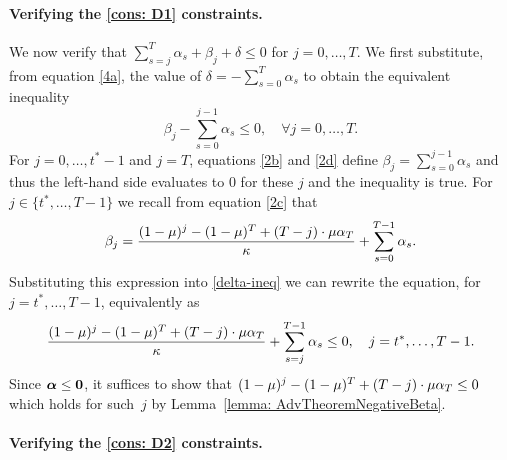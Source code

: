    \paragraph{Verifying the \ref{cons: D1} constraints.} We now verify that $
    \sum_{s=j}^T \alpha_s + \beta_j + \delta \leq 0$ for $j = 0, \ldots, T$.
    We first substitute, from equation \eqref{4a}, the value of $\delta = - \sum_{s=0}^T \alpha_s$ to obtain the equivalent inequality
    \begin{equation}
    \label{delta-ineq}
        \beta_j - \sum_{s=0}^{j-1} \alpha_s \leq 0, \quad \forall j = 0, \ldots, T.
    \end{equation}
    For $j=0, \ldots, {t^*-1}$ and $j=T$, equations \eqref{2b} and \eqref{2d} define $\beta_j = \sum_{s=0}^{j-1} \alpha_s$ and thus the left-hand side evaluates to 0 for these $j$ and the inequality is true. For $j \in \{t^*, \ldots, T-1\}$ we recall from equation \eqref{2c} that 
    \begin{equation*}
        \beta_{j} = \frac{(1-\mu)^j - (1-\mu)^T + (T-j) \cdot \mu \alpha_T}{\kappa} + \sum_{s=0}^{T-1} \alpha_s.
    \end{equation*}
    Substituting this expression into \eqref{delta-ineq} we can rewrite the equation, for $j = t^*, \ldots, T-1$,  equivalently as
    \begin{equation*}
        \frac{(1-\mu)^j - (1-\mu)^T + (T-j) \cdot \mu \alpha_T}{\kappa} + \sum_{s=j}^{T-1} \alpha_s \leq 0, \quad j = t^*, \ldots, T-1.
    \end{equation*}
    Since $\bm{\alpha} \leq \mathbf{0}$, it suffices to show that $(1-\mu)^j - (1-\mu)^T + (T-j) \cdot \mu \alpha_T \leq 0$ which holds for such~$j$ by Lemma~\ref{lemma: AdvTheoremNegativeBeta}. \paragraph{Verifying the \ref{cons: D2} constraints.} 
    
